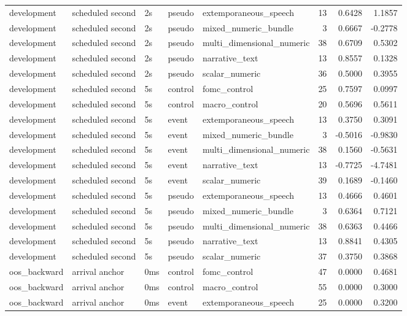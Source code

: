 \begin{tabular}{lllllrrr}
development & scheduled second & 2s & pseudo & extemporaneous_speech & 13 & 0.6428 & 1.1857 \\
development & scheduled second & 2s & pseudo & mixed_numeric_bundle & 3 & 0.6667 & -0.2778 \\
development & scheduled second & 2s & pseudo & multi_dimensional_numeric & 38 & 0.6709 & 0.5302 \\
development & scheduled second & 2s & pseudo & narrative_text & 13 & 0.8557 & 0.1328 \\
development & scheduled second & 2s & pseudo & scalar_numeric & 36 & 0.5000 & 0.3955 \\
development & scheduled second & 5s & control & fomc_control & 25 & 0.7597 & 0.0997 \\
development & scheduled second & 5s & control & macro_control & 20 & 0.5696 & 0.5611 \\
development & scheduled second & 5s & event & extemporaneous_speech & 13 & 0.3750 & 0.3091 \\
development & scheduled second & 5s & event & mixed_numeric_bundle & 3 & -0.5016 & -0.9830 \\
development & scheduled second & 5s & event & multi_dimensional_numeric & 38 & 0.1560 & -0.5631 \\
development & scheduled second & 5s & event & narrative_text & 13 & -0.7725 & -4.7481 \\
development & scheduled second & 5s & event & scalar_numeric & 39 & 0.1689 & -0.1460 \\
development & scheduled second & 5s & pseudo & extemporaneous_speech & 13 & 0.4666 & 0.4601 \\
development & scheduled second & 5s & pseudo & mixed_numeric_bundle & 3 & 0.6364 & 0.7121 \\
development & scheduled second & 5s & pseudo & multi_dimensional_numeric & 38 & 0.6363 & 0.4466 \\
development & scheduled second & 5s & pseudo & narrative_text & 13 & 0.8841 & 0.4305 \\
development & scheduled second & 5s & pseudo & scalar_numeric & 37 & 0.3750 & 0.3868 \\
oos_backward & arrival anchor & 0ms & control & fomc_control & 47 & 0.0000 & 0.4681 \\
oos_backward & arrival anchor & 0ms & control & macro_control & 55 & 0.0000 & 0.3000 \\
oos_backward & arrival anchor & 0ms & event & extemporaneous_speech & 25 & 0.0000 & 0.3200 \\

\end{tabular}
